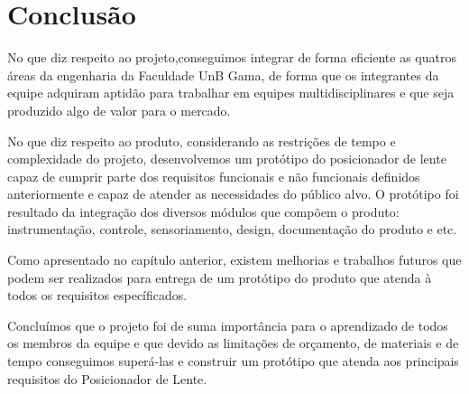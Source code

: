
\chapter[Conclusão]{Conclusão}

No que diz respeito ao projeto,conseguimos integrar de forma eficiente as quatros áreas da engenharia da Faculdade UnB Gama,
de forma que os integrantes da equipe adquiram aptidão para trabalhar em equipes multidisciplinares e que seja produzido algo de valor para
o mercado.
 
No que diz respeito ao produto, considerando as restrições de tempo e complexidade do projeto, desenvolvemos um protótipo do posicionador de lente capaz de cumprir parte dos requisitos funcionais e não funcionais definidos anteriormente e capaz de atender as necessidades do público alvo. O protótipo foi
resultado da integração dos diversos módulos que compõem o produto: instrumentação, controle, sensoriamento,
design, documentação do produto e etc.  

Como apresentado no capítulo anterior, existem melhorias e trabalhos futuros que podem ser realizados para entrega de um protótipo do produto que atenda à todos os requisitos específicados.

Concluímos que o projeto foi de suma importância para o aprendizado de todos os membros da equipe e que devido as limitações de orçamento, de materiais e de tempo conseguimos superá-las e construir um protótipo que atenda aos principais requisitos do Posicionador de Lente.